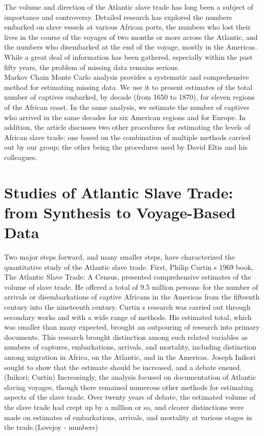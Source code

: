 \documentclass{article}
\begin{document}



The volume and direction of the Atlantic slave trade has long been a subject of importance and controversy. Detailed research has explored the numbers embarked on slave vessels at various African ports, the numbers who lost their lives in the course of the voyages of two months or more across the Atlantic, and the numbers who disembarked at the end of the voyage, mostly in the Americas. While a great deal of information has been gathered, especially within the past fifty years, the problem of missing data remains serious.\\

Markov Chain Monte Carlo analysis provides a systematic and comprehensive method for estimating missing data. We use it to present estimates of the total number of captives embarked, by decade (from 1650 to 1870), for eleven regions of the African coast. In the same analysis, we estimate the number of captives who arrived in the same decades for six American regions and for Europe. In addition, the article discusses two other procedures for estimating the levels of African slave trade: one based on the combination of multiple methods carried out by our group; the other being the procedures used by David Eltis and his colleagues. 



\section{Studies of Atlantic Slave Trade: from Synthesis to Voyage-Based Data}

Two major steps forward, and many smaller steps, have characterized the quantitative study of the Atlantic slave trade. First, Philip Curtin s 1969 book, The Atlantic Slave Trade: A Census, presented comprehensive estimates of the volume of slave trade. He offered a total of 9.5 million persons--for the number of arrivals or disembarkations of captive Africans in the Americas from the fifteenth century into the nineteenth century. Curtin s research was carried out through secondary works and with a wide range of methods. His estimated total, which was smaller than many expected, brought an outpouring of research into primary documents. This research brought distinction among such related variables as numbers of captures, embarkations, arrivals, and mortality, including distinction among migration in Africa, on the Atlantic, and in the Americas. Joseph Inikori sought to show that the estimate should be increased, and a debate ensued.(Inikori; Curtin)  Increasingly, the analysis focused on documentation of Atlantic slaving voyages, though there remained numerous other methods for estimating aspects of the slave trade. Over twenty years of debate, the estimated volume of the slave trade had crept up by a million or so, and clearer distinctions were made on estimates of embarkations, arrivals, and mortality at various stages in the trade.(Lovejoy - numbers)\\ 
\end{document}
